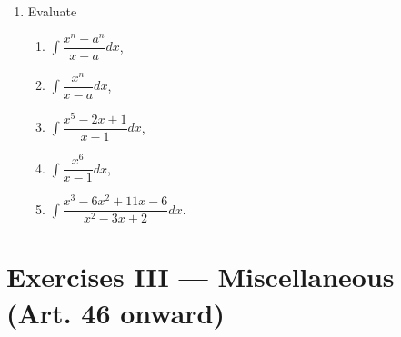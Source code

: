 \documentclass[11pt, a4paper]{article}
\begin{document}
\begin{enumerate}[leftmargin=2em]
\item Evaluate
\begin{enumerate}[label=(\roman*)]
\item $\displaystyle\int \dfrac{x^n-a^n}{x-a}dx$,
\item $\displaystyle\int \dfrac{x^n}{x-a}dx$,
\item $\displaystyle\int \dfrac{x^5-2x+1}{x-1}dx$,
\item $\displaystyle\int \dfrac{x^6}{x-1}dx$,
\item $\displaystyle\int \dfrac{x^3-6x^2+11x-6}{x^2-3x+2}dx$.
\end{enumerate}

\end{enumerate}

\section*{Exercises III --- Miscellaneous (Art. 46 onward)}
\end{document}
